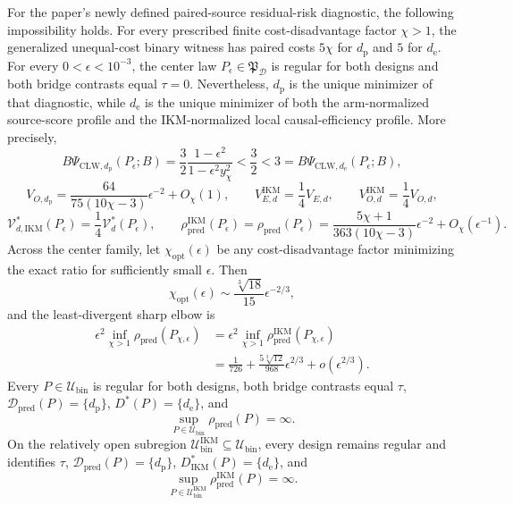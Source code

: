 For the paper's newly defined paired-source residual-risk diagnostic, the following impossibility holds. For every prescribed finite cost-disadvantage factor \(\chi>1\), the generalized unequal-cost binary witness has paired costs \(5\chi\) for \(d_{\mathrm p}\) and \(5\) for \(d_{\mathrm e}\). For every \(0<\epsilon<10^{-3}\), the center law \(P_\epsilon\in\mathfrak P_{\mathcal D}\) is regular for both designs and both bridge contrasts equal \(\tau=0\). Nevertheless, \(d_{\mathrm p}\) is the unique minimizer of that diagnostic, while \(d_{\mathrm e}\) is the unique minimizer of both the arm-normalized source-score profile and the IKM-normalized local causal-efficiency profile. More precisely,
\[
 B\Psi_{\mathrm{CLW},d_{\mathrm p}}(P_\epsilon;B)
 =\frac32\frac{1-\epsilon^2}{1-\epsilon^2y_\chi^2}
 <\frac32<3
 =B\Psi_{\mathrm{CLW},d_{\mathrm e}}(P_\epsilon;B),
\]
\[
 V_{O,d_{\mathrm p}}
 =\frac{64}{75(10\chi-3)}\epsilon^{-2}+O_\chi(1),
 \qquad
 V_{E,d}^{\mathrm{IKM}}=\frac14V_{E,d},
 \qquad
 V_{O,d}^{\mathrm{IKM}}=\frac14V_{O,d},
\]
\[
 \mathcal V_{d,\mathrm{IKM}}^*(P_\epsilon)
 =\frac14\mathcal V_d^*(P_\epsilon),
 \qquad
 \rho_{\mathrm{pred}}^{\mathrm{IKM}}(P_\epsilon)
 =\rho_{\mathrm{pred}}(P_\epsilon)
 =\frac{5\chi+1}{363(10\chi-3)}\epsilon^{-2}
 +O_\chi(\epsilon^{-1}).
\]
Across the center family, let \(\chi_{\mathrm{opt}}(\epsilon)\) be any cost-disadvantage factor minimizing the exact ratio for sufficiently small \(\epsilon\). Then
\[
 \chi_{\mathrm{opt}}(\epsilon)
 \sim \frac{\sqrt[3]{18}}{15}\epsilon^{-2/3},
\]
and the least-divergent sharp elbow is
\[
\begin{aligned}
 \epsilon^2\inf_{\chi>1}\rho_{\mathrm{pred}}(P_{\chi,\epsilon})
 &=\epsilon^2\inf_{\chi>1}\rho_{\mathrm{pred}}^{\mathrm{IKM}}(P_{\chi,\epsilon})\\
 &=\frac1{726}+\frac{5\sqrt[3]{12}}{968}\epsilon^{2/3}
 +o(\epsilon^{2/3}).
\end{aligned}
\]
Every \(P\in\mathcal U_{\mathrm{bin}}\) is regular for both designs, both bridge contrasts equal \(\tau\), \(\mathcal D_{\mathrm{pred}}(P)=\{d_{\mathrm p}\}\), \(D^*(P)=\{d_{\mathrm e}\}\), and
\[
 \sup_{P\in\mathcal U_{\mathrm{bin}}}\rho_{\mathrm{pred}}(P)=\infty.
\]
On the relatively open subregion \(\mathcal U_{\mathrm{bin}}^{\mathrm{IKM}}\subseteq\mathcal U_{\mathrm{bin}}\), every design remains regular and identifies \(\tau\), \(\mathcal D_{\mathrm{pred}}(P)=\{d_{\mathrm p}\}\), \(D_{\mathrm{IKM}}^*(P)=\{d_{\mathrm e}\}\), and
\[
 \sup_{P\in\mathcal U_{\mathrm{bin}}^{\mathrm{IKM}}}
 \rho_{\mathrm{pred}}^{\mathrm{IKM}}(P)=\infty.
\]
